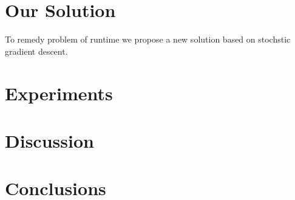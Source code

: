 \documentclass[a4paper]{article}
\begin{document}
\section{Our Solution}

To remedy problem of runtime we propose a new solution based on 
stochstic gradient descent. 


\section{Experiments}
\section{Discussion}
\section{Conclusions}


%
%
\end{document}
